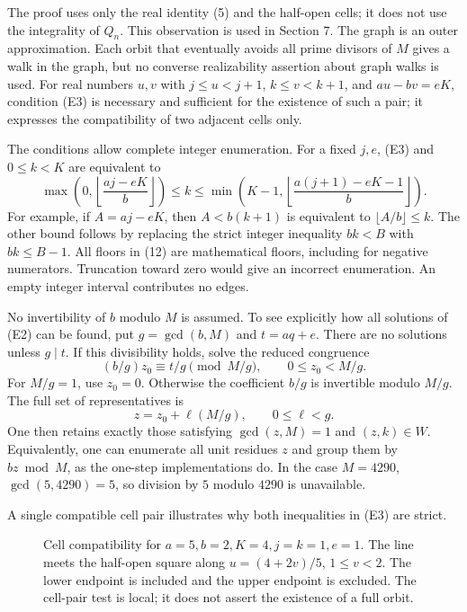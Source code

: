 \documentclass[11pt,reqno]{amsart}
\theoremstyle{definition}
\theoremstyle{remark}
\begin{document}
The proof uses only the real identity (5) and the half-open cells; it
does not use the integrality of \(Q_n\). This observation is used in
Section 7. The graph is an outer approximation. Each orbit that
eventually avoids all prime divisors of \(M\) gives a walk in the graph,
but no converse realizability assertion about graph walks is used. For
real numbers \(u,v\) with \(j\le u<j+1\), \(k\le v<k+1\), and
\(au-bv=eK\), condition (E3) is necessary and sufficient for the
existence of such a pair; it expresses the compatibility of two adjacent
cells only.

The conditions allow complete integer enumeration. For a fixed \(j,e\),
(E3) and \(0\le k<K\) are equivalent to
\[
\max\!\left(0,\left\lfloor\frac{aj-eK}{b}\right\rfloor\right)
\le k\le
\min\!\left(K-1,\left\lfloor\frac{a(j+1)-eK-1}{b}\right\rfloor\right).
\tag{12}\label{eq:12}
\]
For example, if \(A=aj-eK\), then \(A<b(k+1)\) is equivalent to
\(\lfloor A/b\rfloor\le k\). The other bound follows by replacing the
strict integer inequality \(bk<B\) with \(bk\le B-1\).
All floors in (12) are mathematical floors, including for negative
numerators. Truncation toward zero would give an incorrect enumeration.
An empty integer interval contributes no edges.

No invertibility of \(b\) modulo \(M\) is assumed. To see explicitly how
all solutions of (E2) can be found, put \(g=\gcd(b,M)\) and \(t=aq+e\).
There are no solutions unless \(g\mid t\). If this divisibility holds,
solve the reduced congruence
\[
(b/g)z_0\equiv t/g\pmod{M/g},\qquad 0\le z_0<M/g.
\]
For \(M/g=1\), use \(z_0=0\). Otherwise the coefficient \(b/g\) is
invertible modulo \(M/g\). The full set of representatives is
\[
z=z_0+\ell(M/g),\qquad 0\le\ell<g.
\tag{13}\label{eq:13}
\]
One then retains exactly those satisfying \(\gcd(z,M)=1\) and
\((z,k)\in W\). Equivalently, one can enumerate all unit residues \(z\)
and group them by \(bz\bmod M\), as the one-step implementations do.
In the case \(M=4290\), \(\gcd(5,4290)=5\), so division by \(5\) modulo
\(4290\) is unavailable.

A single compatible cell pair illustrates why both inequalities in (E3) are strict.

\begin{figure}[htbp]
\centering

\caption{Cell compatibility for \(a=5,b=2,K=4,j=k=1,e=1\). The line meets the half-open square along \(u=(4+2v)/5\), \(1\le v<2\). The lower endpoint is included and the upper endpoint is excluded. The cell-pair test is local; it does not assert the existence of a full orbit.}
\label{fig:cell-intersection}
\end{figure}
\end{document}
